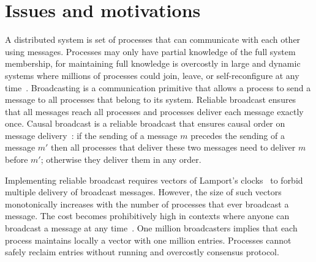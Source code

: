 
\section{Issues and motivations}
\label{sec:motivations}

A distributed system is set of processes that can communicate with each other
using messages. Processes may only have partial knowledge of the full system
membership, for maintaining full knowledge is overcostly in large and dynamic
systems where millions of processes could join, leave, or self-reconfigure at
any time~\cite{birman1999bimodal,demers1987epidemic}. Broadcasting is a
communication primitive that allows a process to send a message to all processes
that belong to its system. Reliable broadcast ensures that all messages reach
all processes and processes deliver each message exactly once. Causal broadcast
is a reliable broadcast that ensures causal order on message
delivery~\cite{hadzilacos1994modular}:
if the sending of a message $m$ precedes the sending of a message $m'$ then all
processes that deliver these two messages need to deliver $m$ before $m'$;
otherwise they deliver them in any order.

Implementing reliable broadcast requires vectors of Lamport's
clocks~\cite{lamport1978time} to forbid multiple delivery of broadcast
messages. However, the size of such vectors monotonically increases with the
number of processes that ever broadcast a message. The cost becomes
prohibitively high in contexts where anyone can broadcast a message at any
time~\cite{borthakur2013petabyte,nedelec2016crate,slate13}. One million
broadcasters implies that each process maintains locally a vector with one
million entries. Processes cannot safely reclaim entries without running and
overcostly consensus protocol.


